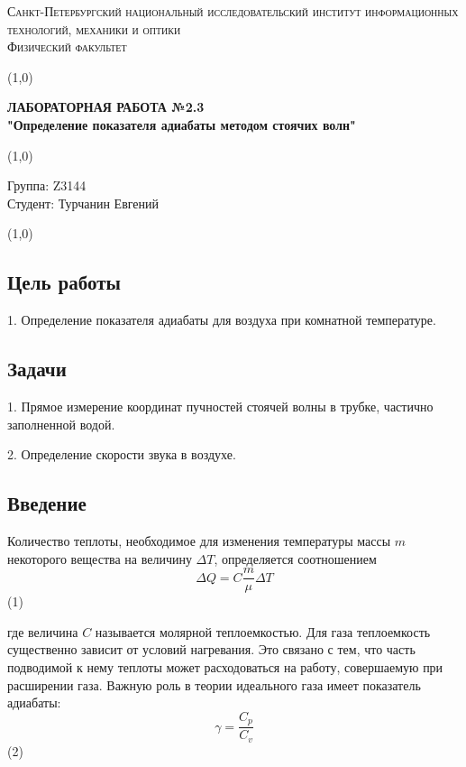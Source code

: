 \documentclass[a4paper]{article}
\begin{document}
\begin{center}
\textsc{Санкт-Петербургский национальный исследовательский институт информационных технологий, механики и оптики\\[3mm]
Физический факультет} \\[3mm]

\end{center}
\vspace{5mm}
\line(1,0){\textwidth}
\begin{center}
\textbf{ЛАБОРАТОРНАЯ РАБОТА №2.3\\}
\textbf{"Определение показателя адиабаты методом стоячих волн"}
\end{center}
\vspace{2mm}
\line(1,0){\textwidth}
\vspace{5mm}
\begin{minipage}{0.4\textwidth}
    Группа: Z3144 \\
    Студент: Турчанин Евгений\\
    \vspace{1mm}
\end{minipage}
\hfill
\vspace{1mm}
\line(1,0){\textwidth}

\subsection*{Цель работы}
1. Определение показателя адиабаты для воздуха при комнатной температуре.

\subsection*{Задачи}
1. Прямое измерение координат пучностей стоячей волны в трубке, частично заполненной водой.

2. Определение скорости звука в воздухе.

\subsection*{Введение}
Количество теплоты, необходимое для изменения температуры массы $m$ некоторого вещества на величину $\Delta T$, определяется соотношением
\[
\Delta Q = C \frac{m}{\mu} \Delta T
\]
(1)

где величина $C$ называется молярной теплоемкостью. Для газа теплоемкость существенно зависит от условий нагревания. Это связано с тем, что часть подводимой к нему теплоты может расходоваться на работу, совершаемую при расширении газа. Важную роль в теории идеального газа имеет показатель адиабаты:
\[
\gamma = \frac{C_p}{C_v}
\]
(2)
\end{document}
